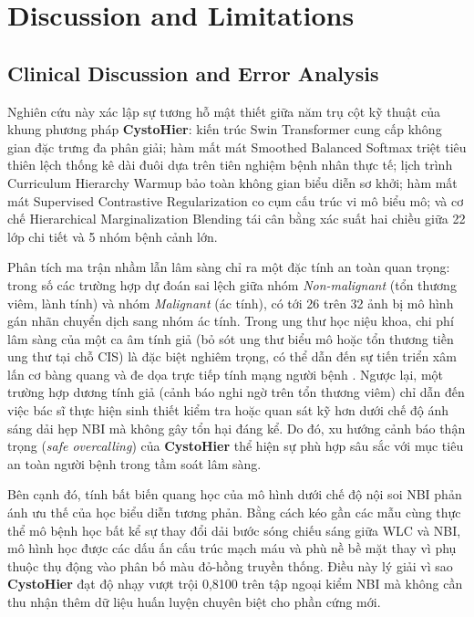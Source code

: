 \documentclass[runningheads]{llncs}
\begin{document}
\section{Discussion and Limitations}
\label{sec:discussion}

\subsection{Clinical Discussion and Error Analysis}
Nghiên cứu này xác lập sự tương hỗ mật thiết giữa năm trụ cột kỹ thuật của khung phương pháp \textbf{CystoHier}: kiến trúc Swin Transformer cung cấp không gian đặc trưng đa phân giải; hàm mất mát Smoothed Balanced Softmax triệt tiêu thiên lệch thống kê dài đuôi dựa trên tiên nghiệm bệnh nhân thực tế; lịch trình Curriculum Hierarchy Warmup bảo toàn không gian biểu diễn sơ khởi; hàm mất mát Supervised Contrastive Regularization co cụm cấu trúc vi mô biểu mô; và cơ chế Hierarchical Marginalization Blending tái cân bằng xác suất hai chiều giữa 22 lớp chi tiết và 5 nhóm bệnh cảnh lớn.

Phân tích ma trận nhầm lẫn lâm sàng chỉ ra một đặc tính an toàn quan trọng: trong số các trường hợp dự đoán sai lệch giữa nhóm \textit{Non-malignant} (tổn thương viêm, lành tính) và nhóm \textit{Malignant} (ác tính), có tới 26 trên 32 ảnh bị mô hình gán nhãn chuyển dịch sang nhóm ác tính. Trong ung thư học niệu khoa, chi phí lâm sàng của một ca âm tính giả (bỏ sót ung thư biểu mô hoặc tổn thương tiền ung thư tại chỗ CIS) là đặc biệt nghiêm trọng, có thể dẫn đến sự tiến triển xâm lấn cơ bàng quang và đe dọa trực tiếp tính mạng người bệnh \cite{ref_babjuk2022eau}. Ngược lại, một trường hợp dương tính giả (cảnh báo nghi ngờ trên tổn thương viêm) chỉ dẫn đến việc bác sĩ thực hiện sinh thiết kiểm tra hoặc quan sát kỹ hơn dưới chế độ ánh sáng dải hẹp NBI mà không gây tổn hại đáng kể. Do đó, xu hướng cảnh báo thận trọng (\textit{safe overcalling}) của \textbf{CystoHier} thể hiện sự phù hợp sâu sắc với mục tiêu an toàn người bệnh trong tầm soát lâm sàng.

Bên cạnh đó, tính bất biến quang học của mô hình dưới chế độ nội soi NBI phản ánh ưu thế của học biểu diễn tương phản. Bằng cách kéo gần các mẫu cùng thực thể mô bệnh học bất kể sự thay đổi dải bước sóng chiếu sáng giữa WLC và NBI, mô hình học được các dấu ấn cấu trúc mạch máu và phù nề bề mặt thay vì phụ thuộc thụ động vào phân bố màu đỏ-hồng truyền thống. Điều này lý giải vì sao \textbf{CystoHier} đạt độ nhạy vượt trội 0,8100 trên tập ngoại kiểm NBI mà không cần thu nhận thêm dữ liệu huấn luyện chuyên biệt cho phần cứng mới.
\end{document}
